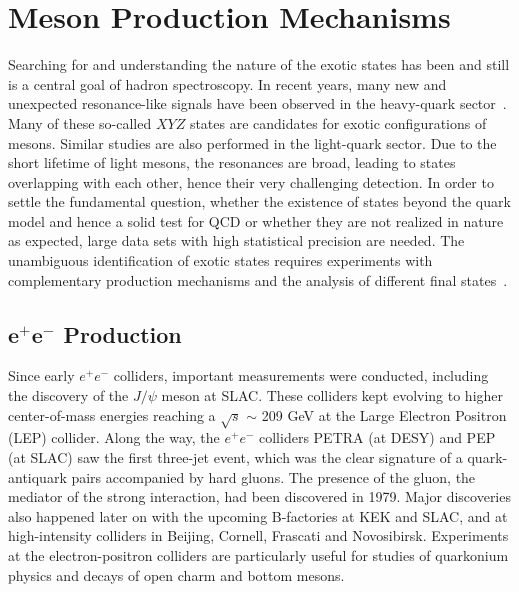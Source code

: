 \section{Meson Production Mechanisms}
\label{p.1.3}

Searching for and understanding the nature of the exotic states has been and still is a central goal of hadron spectroscopy. In recent years, many new and unexpected resonance-like signals have been observed in the heavy-quark sector~\cite{Tanabashi18}. Many of these so-called $XYZ$ states are candidates for exotic configurations of mesons. Similar studies are also performed in the light-quark sector. Due to the short lifetime of light mesons, the resonances are broad, leading to states overlapping with each other, hence their very challenging detection. In order to settle the fundamental question, whether the existence of states beyond the quark model and hence a solid test for QCD or whether they are not realized in nature as expected, large data sets with high statistical precision are needed. The unambiguous identification of exotic states requires experiments with complementary production mechanisms and the analysis of different final states~\cite{Szczepaniak01}.
 
\subsection{\texorpdfstring{$\bm{e^{+}e^{-}}$}{} Production}

Since early $e^{+}e^{-}$ colliders, important measurements were conducted, including the discovery of the $J/\psi$ meson at SLAC. These colliders kept evolving to higher center-of-mass energies reaching a $\sqrt{s}$ $\sim$ 209 GeV at the Large Electron Positron (LEP) collider. Along the way, the $e^{+}e^{-}$ colliders PETRA (at DESY) and PEP (at SLAC) saw the first three-jet event, which was the clear signature of a quark-antiquark pairs accompanied by hard gluons. The presence of the gluon, the mediator of the strong interaction, had been discovered in 1979. Major discoveries also happened later on with the upcoming B-factories at KEK and SLAC, and at high-intensity colliders in Beijing, Cornell, Frascati and Novosibirsk. Experiments at the electron-positron colliders are particularly useful for studies of quarkonium physics and decays of open charm and bottom mesons.


